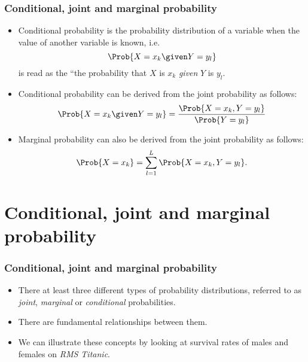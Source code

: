 \documentclass[10pt,xcolor=dvipsnames,serif,professionalfont]{beamer} %
\begin{document}
\begin{frame}
\frametitle{Conditional, joint and marginal probability}
\begin{itemize}
\item Conditional probability is the probability distribution of a variable when the value of another variable is known, i.e. 
\begin{equation}
\Prob{X=x_k \given Y=y_l } 
\end{equation}
is read as the ``the probability that $X$ is $x_k$ \emph{given} $Y$ is $y_l$.
\item Conditional probability can be derived from the joint probability as follows:
\begin{equation}
\Prob{X=x_k \given Y=y_l } = \frac{\Prob{X=x_k, Y=y_l }}{ \Prob{Y=y_l } }
\end{equation}
\item Marginal probability can also be derived from the joint probability as follows:
\begin{equation}
\Prob{X=x_k} = \sum_{l=1}^L \Prob{X=x_k, Y=y_l }.
\end{equation}
\end{itemize}
\end{frame}



\section{Conditional, joint and marginal probability}

\begin{frame}
\frametitle{Conditional, joint and marginal probability}
\begin{itemize}
\item There at least three different types of probability distributions,
referred to as \emph{joint}, \emph{marginal} or \emph{conditional} probabilities. 
\item There are
fundamental relationships between them. 
\item We can illustrate these concepts by looking at survival rates of males and females on \emph{RMS Titanic}.
\end{itemize}
\end{frame}
\end{document}
